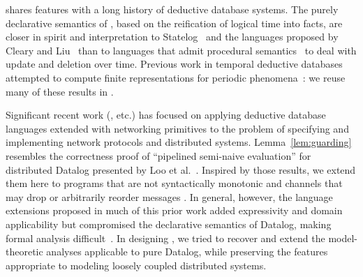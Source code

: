 \lang shares features with a long history of deductive database systems.
The purely declarative semantics of \lang, based on the reification of logical time into
facts, are closer in spirit and interpretation to  Statelog~\cite{statelog} and
the languages proposed by Cleary and Liu~\cite{harmful,deductiveupdates,starlog} than
to languages that admit procedural semantics~\cite{ldl, glue-nail} to deal with update 
and deletion over time.
Previous work in temporal deductive databases attempted to compute finite representations for periodic phenomena~\cite{tdd-infinite}: we reuse many of these results in \lang.

Significant recent work (\cite{boom,Belaramani:2009,Chu:2007,Loo2009-CACM}, etc.) has focused on applying deductive database languages extended with networking 
primitives to the problem of specifying and implementing network protocols and distributed systems.  Lemma~\ref{lem:guarding} resembles the  correctness proof of ``pipelined
semi-naive evaluation'' for distributed Datalog presented by Loo et al.~\cite{loo-sigmod06}.
Inspired by those results, we extend them here to programs that are not syntactically 
monotonic and channels that may drop or arbitrarily reorder messages .
In general, however, the language extensions 
proposed in much of this prior work added
expressivity and domain applicability but compromised the declarative
semantics of Datalog, making formal analysis difficult~\cite{Mao2009, navarro}.
In designing \lang, we tried to recover and extend the model-theoretic analyses applicable
to pure Datalog, while preserving the features appropriate to modeling loosely coupled
distributed systems.

